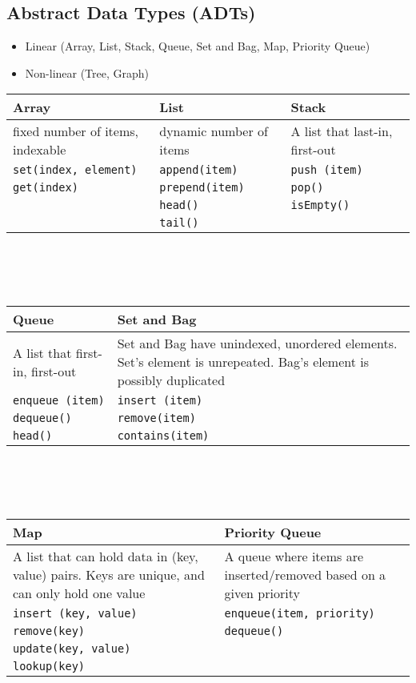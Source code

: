 \documentclass[a4paper]{article}
\begin{document}
\subsection{Abstract Data Types (ADTs)}
\begin{itemize}
    \item Linear (Array, List, Stack, Queue, Set and Bag, Map, Priority Queue)
    \item Non-linear (Tree, Graph)
\end{itemize}
\begin{spacing}{1.5}
\begin{tabularx}{1\textwidth}{X|X|X}
    \hline
    \textbf{Array} & \textbf{List} & \textbf{Stack}\\
    \hline
    fixed number of items, indexable&dynamic number of items&A list that last-in, first-out\\
    \hline
    \verb|set(index, element)|&\verb|append(item)|&\verb|push (item)|\\
    \verb|get(index)|&\verb|prepend(item)|&\verb|pop()|\\
    &\verb|head()|&\verb|isEmpty()|\\
    &\verb|tail()|&\\
    \hline
\end{tabularx}
\ \\\ \\\ \\
\begin{tabularx}{1\textwidth}{X|p{}}
    \hline
    \textbf{Queue} & \textbf{Set and Bag}\\
    \hline
    A list that first-in, first-out&Set and Bag have unindexed, unordered elements. Set's element is unrepeated. Bag's element is possibly duplicated\\
    \hline
    \verb|enqueue (item)|&\verb|insert (item)|\\
    \verb|dequeue()|&\verb|remove(item)|\\
    \verb|head()|&\verb|contains(item)|\\
    \hline
\end{tabularx}
\ \\\ \\\ \\
\begin{tabularx}{1\textwidth}{X|X}
    \hline
    \textbf{Map} & \textbf{Priority Queue}\\
    \hline
    A list that can hold data in (key, value) pairs. Keys are unique, and can only hold one value & A queue where items are inserted/removed based on a given priority\\
    \hline
    \verb|insert (key, value)|&\verb|enqueue(item, priority)|\\
    \verb|remove(key)|&\verb|dequeue()|\\
    \verb|update(key, value)|&\\
    \verb|lookup(key)|&\\
    \hline
\end{tabularx}
\end{spacing}
\end{document}
